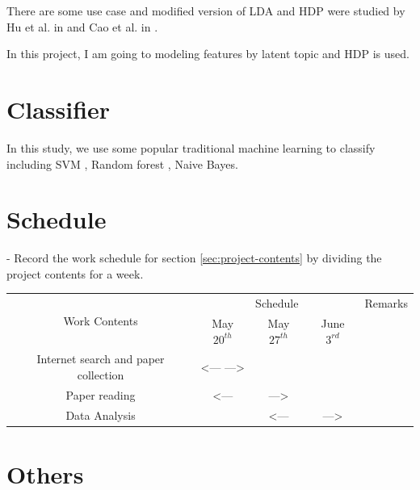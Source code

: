 \documentclass[12pt]{article}
\begin{document}
There are some use case and modified version of LDA and HDP were studied by Hu et al. in \cite{Hu2009} and Cao et al. in \cite{Cao2007}.

In this project, I am going to modeling features by latent topic and HDP is used.

\section{Classifier}
In this study, we use some popular traditional machine learning to classify including SVM \cite{suykens1999least}, Random forest \cite{liaw2002classification}, Naive Bayes.


\section{Schedule}
- Record the work schedule for section \ref{sec:project-contents} by dividing the project contents for a week.

\begin{table}[h!]
\begin{tabular}{|c|c|c|c|c|}
\hline
\multirow{2}{*}{Work Contents} & \multicolumn{3}{c|}{Schedule} & Remarks \\ \cline{2-5} 
 & May $20^{th}$ & May $27^{th}$ & June $3^{rd}$ &    \\ \hline
Internet search and paper collection & \textless--- ---\textgreater &  &  &      \\ \hline
Paper reading & \textless---  & ---\textgreater &  &      \\ \hline
Data Analysis &  & \textless--- & ---\textgreater &    \\ \hline
\end{tabular}
\end{table}

\section{Others}


 
\end{document}
